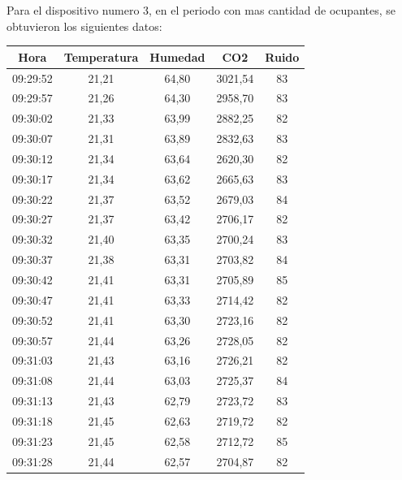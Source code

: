 \documentclass{templateNote}
\begin{document}
\newpage
\noindent Para el dispositivo numero 3, en el periodo con mas cantidad de ocupantes, se obtuvieron los siguientes datos:
\begin{table}[H]
    \centering
    \begin{tabular}{|c|c|c|c|c|}
        \hline
        Hora     & Temperatura & Humedad & CO2 & Ruido \\ \hline
        09:29:52 & 21,21     & 64,80     & 3021,54   & 83        \\ \hline
        09:29:57 & 21,26     & 64,30     & 2958,70   & 83        \\ \hline
        09:30:02 & 21,33     & 63,99     & 2882,25   & 82        \\ \hline
        09:30:07 & 21,31     & 63,89     & 2832,63   & 83        \\ \hline
        09:30:12 & 21,34     & 63,64     & 2620,30   & 82        \\ \hline
        09:30:17 & 21,34     & 63,62     & 2665,63   & 83        \\ \hline
        09:30:22 & 21,37     & 63,52     & 2679,03   & 84        \\ \hline
        09:30:27 & 21,37     & 63,42     & 2706,17   & 82        \\ \hline
        09:30:32 & 21,40     & 63,35     & 2700,24   & 83        \\ \hline
        09:30:37 & 21,38     & 63,31     & 2703,82   & 84        \\ \hline
        09:30:42 & 21,41     & 63,31     & 2705,89   & 85        \\ \hline
        09:30:47 & 21,41     & 63,33     & 2714,42   & 82        \\ \hline
        09:30:52 & 21,41     & 63,30     & 2723,16   & 82        \\ \hline
        09:30:57 & 21,44     & 63,26     & 2728,05   & 82        \\ \hline
        09:31:03 & 21,43     & 63,16     & 2726,21   & 82        \\ \hline
        09:31:08 & 21,44     & 63,03     & 2725,37   & 84        \\ \hline
        09:31:13 & 21,43     & 62,79     & 2723,72   & 83        \\ \hline
        09:31:18 & 21,45     & 62,63     & 2719,72   & 82        \\ \hline
        09:31:23 & 21,45     & 62,58     & 2712,72   & 85        \\ \hline
        09:31:28 & 21,44     & 62,57     & 2704,87   & 82        \\ \hline

\end{tabular}
\end{table}
\end{document}
